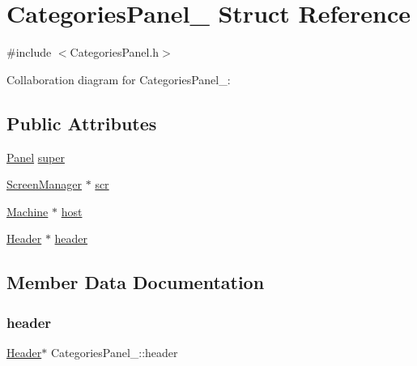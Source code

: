 \hypertarget{structCategoriesPanel__}{}\section{Categories\+Panel\+\_\+ Struct Reference}
\label{structCategoriesPanel__}


{\ttfamily \#include $<$Categories\+Panel.\+h$>$}



Collaboration diagram for Categories\+Panel\+\_\+\+:
\subsection*{Public Attributes}
\begin{DoxyCompactItemize}
\item 
\hyperlink{Panel_8h_a034d4c16521db412dc7a1e8536d16fae}{Panel} \hyperlink{structCategoriesPanel___a7a23f2ac4e8cc310a81666b1d3746877}{super}
\item 
\hyperlink{ScreenManager_8h_a798c9c69dc8024a4c6829982bf94dddd}{Screen\+Manager} $\ast$ \hyperlink{structCategoriesPanel___a5f9e58d23e4782965dfa24832713464b}{scr}
\item 
\hyperlink{Machine_8h_aa3706f95e4706b9d02979efcabb1341d}{Machine} $\ast$ \hyperlink{structCategoriesPanel___a3af23ac869ef60bc8f9e162c1d641e61}{host}
\item 
\hyperlink{linux_2download_2htop-3_83_80_2Header_8h_a7f4dfcf80c34406946a7bda3d88d5e36}{Header} $\ast$ \hyperlink{structCategoriesPanel___ad5e709e4221dd829cf6d8830490824ab}{header}
\end{DoxyCompactItemize}


\subsection{Member Data Documentation}
\mbox{\label{structCategoriesPanel___ad5e709e4221dd829cf6d8830490824ab}} 
\subsubsection{\texorpdfstring{header}{header}}
{\footnotesize\ttfamily \hyperlink{linux_2download_2htop-3_83_80_2Header_8h_a7f4dfcf80c34406946a7bda3d88d5e36}{Header}$\ast$ Categories\+Panel\+\_\+\+::header}

